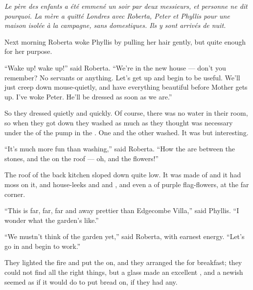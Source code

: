 \documentclass[troisieme]{fiche}
\begin{document}
\noindent\small\textit{Le père des enfants a été emmené un soir par deux messieurs, et
personne ne dit pourquoi. La mère a quitté Londres avec Roberta, Peter et Phyllis pour une
maison isolée à la campagne, sans domestiques. Ils y sont arrivés de nuit.}\normalsize

\begin{texte}
Next morning Roberta woke Phyllis by pulling her hair gently, but quite enough for her
purpose.

``Wake up! wake up!'' said Roberta. ``We're in the new house --- don't you remember? No
servants or anything. Let's get up and begin to be useful. We'll just creep down
mouse-quietly, and have everything beautiful before Mother gets up. I've woke Peter. He'll be
dressed as soon as we are.''

So they dressed quietly and quickly. Of course, there was no water in their room, so when
they got down they washed as much as they thought was necessary under the
 of the pump in the . One
 and the other washed. It was  but interesting.

``It's much more fun than  washing,'' said Roberta. ``How
 the  are between the
stones, and the  on the roof --- oh, and the flowers!''

The roof of the back kitchen sloped down quite low. It was made of
 and it had moss on it, and house-leeks and
 and , and even
a  of purple flag-flowers, at the far corner.

``This is far, far, far and away prettier than Edgecombe Villa,'' said Phyllis. ``I wonder
what the garden's like.''

``We mustn't think of the garden yet,'' said Roberta, with earnest energy. ``Let's go in and
begin to work.''

They lighted the fire and put the  on, and they arranged
the  for breakfast; they could not find all the right
things, but a glass  made an excellent
, and a newish  seemed as if it would do to put bread on, if they had any.


\end{texte}
\end{document}
